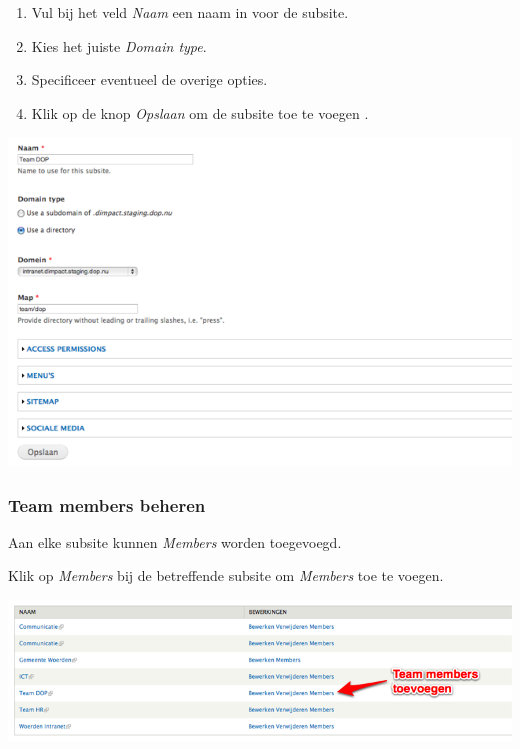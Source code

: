 \bigskip

\begin{enumerate}
\item Vul bij het veld \emph{Naam} een naam in voor de subsite.
\item Kies het juiste \emph{Domain type}.
\item Specificeer eventueel de overige opties.
\item Klik op de knop \emph{Opslaan} om de subsite toe te voegen .
\end{enumerate}

\bigskip

\begin{center}
	\includegraphics[width=\textwidth]{img/dominion2.png}
\end{center}

\subsubsection{Team members beheren}\label{teammembersbeheren}
Aan elke subsite kunnen \emph{Members} worden toegevoegd.

\bigskip

Klik op \emph{Members} bij de betreffende subsite om \emph{Members} toe te voegen.

\begin{center}
	\includegraphics[width=\textwidth]{img/dominion3.png}
\end{center}


